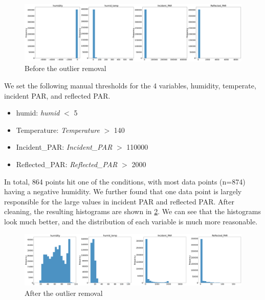 \documentclass[11pt, letterpaper]{article}
\begin{document}
\begin{figure}[h!]
\centering
\captionsetup{justification=centering}
\includegraphics[width=1.0\textwidth]{Fig3_combined_hist.png}
\caption{Before the outlier removal}
\label{fig3:combined_hist}
\end{figure}

We set the following manual thresholds for the 4  variables, humidity, temperate, incident PAR, and reflected PAR.

\begin{itemize}
    \item humid: \textit{humid} $<$ 5
    \item Temperature: \textit{Temperature} $>$  140
    \item Incident\_PAR: \textit{Incident\_PAR} $>$  110000
    \item Reflected\_PAR: \textit{Reflected\_PAR} $>$  2000
\end{itemize}
In total, 864 points hit one of the conditions, with most data points (n=874) having a negative humidity. We further found that one data point is largely responsible for the large values in incident PAR and reflected PAR. After cleaning, the resulting histograms are shown in \ref{fig3:combined_hist_after_clean}. We can see that the histograms look much better, and the distribution of each variable is much more reasonable.

\begin{figure}[h!]
\centering
\captionsetup{justification=centering}
\includegraphics[width=1.0\textwidth]{Fig4_combined_hist_after.png}
\caption{After the outlier removal}
\label{fig3:combined_hist_after_clean}
\end{figure}
\end{document}
